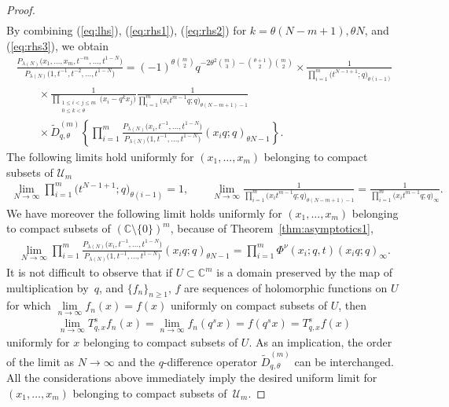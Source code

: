 \documentclass[pdftex]{sigma}
\numberwithin{equation}{section}
\newcommand{\C}{\mathbb{C}}
\newcommand{\U}{\mathcal{U}}
\begin{document}
\begin{proof}
\begin{gather}
\end{gather}
By combining (\ref{eq:lhs}), (\ref{eq:rhs1}), (\ref{eq:rhs2}) for $k = \theta(N-m+1), \theta N$, and (\ref{eq:rhs3}), we obtain
\begin{gather*}
\frac{P_{\lambda(N)}\big(x_1, \dots, x_m, t^{-m}, \dots, t^{1-N}\big)}{P_{\lambda(N)}\big(1, t^{-1}, t^{-2}, \dots, t^{1-N}\big)}
 = (-1)^{\theta {m \choose 2}}q^{-2\theta^2 {m \choose 3} - {\theta + 1\choose 2}{m \choose 2}}\times\frac{1}{\prod\limits_{i=1}^m{\big(t^{N-i+1}; q\big)_{\theta(i-1)}}}\\
 \qquad{}
\times\frac{1}{\prod\limits_{\substack{ 1\leq i < j\leq m \\ 0\leq k<\theta }}{\big(x_i - q^kx_j\big)}}\frac{1}{\prod\limits_{i=1}^m{\big(x_i t^{m-1}q; q\big)_{\theta(N-m+1)-1}}}\\
\qquad{}\times \widetilde{D}_{q, \theta}^{(m)}\left\{ \prod\limits_{i=1}^m{\frac{P_{\lambda(N)}\big(x_i, t^{-1}, \dots, t^{1-N}\big)}{P_{\lambda(N)}\big(1, t^{-1}, \dots, t^{1-N}\big)} (x_i q; q)_{\theta N - 1} } \right\}.
\end{gather*}
The following limits hold uniformly for $(x_1, \dots, x_m)$ belonging to compact subsets of $\U_m$
\begin{gather*}
\lim_{N\rightarrow\infty}{\prod_{i=1}^m{\big(t^{N-1+1}; q\big)}_{\theta(i-1)}} = 1, \qquad \lim_{N\rightarrow\infty}{\frac{1}{\prod\limits_{i=1}^m{\big(x_i t^{m-1}q; q\big)_{\theta(N-m+1)-1}}}} = \frac{1}{\prod\limits_{i=1}^m{\big(x_it^{m-1}q; q\big)_{\infty}}}.
\end{gather*}
We have moreover the following limit holds uniformly for $(x_1, \dots, x_m)$ belonging to compact subsets of $ (\C\setminus\{0\} )^m$, because of Theorem~\ref{thm:asymptotics1},
\begin{gather*}
\lim_{N\rightarrow\infty}{\prod_{i=1}^m{\frac{P_{\lambda(N)}\big(x_i, t^{-1}, \dots, t^{1-N}\big)}{P_{\lambda(N)}\big(1, t^{-1}, \dots, t^{1-N}\big)} (x_i q; q)_{\theta N - 1}}} = \prod_{i=1}^m{\Phi^{\nu}(x_i; q, t)(x_iq; q)_{\infty}}.
\end{gather*}
It is not dif\/f\/icult to observe that if $U\subset\C^m$ is a domain preserved by the map of multiplication by~$q$, and $\{f_n\}_{n\geq 1}$, $f$ are sequences of holomorphic functions on $U$ for which $\lim\limits_{n\rightarrow\infty}{f_n(x)} = f(x)$ uniformly on compact subsets of $U$, then
\begin{gather*}
\lim_{n\rightarrow\infty}{T_{q, x}^sf_n(x)} = \lim_{n\rightarrow\infty}{f_n(q^s x)} = f(q^sx) = T_{q, x}^sf(x)
\end{gather*}
uniformly for $x$ belonging to compact subsets of $U$. As an implication, the order of the limit as $N\rightarrow\infty$ and the $q$-dif\/ference operator $\widetilde{D}_{q, \theta}^{(m)}$ can be interchanged. All the considerations above immediately imply the desired uniform limit for $(x_1, \dots, x_m)$ belonging to compact subsets of~$\U_m$.


\end{proof}
\end{document}
